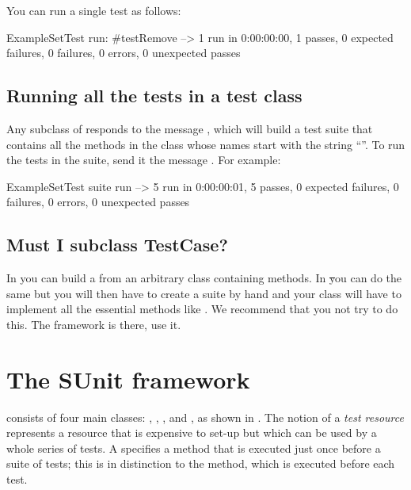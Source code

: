 \documentclass[a4paper,10pt,twoside]{book}
\begin{document}
You can run a single test as follows:

\begin{code}{}
ExampleSetTest run: #testRemove --> 1 run in 0:00:00:00, 1 passes, 0 expected failures, 0 failures, 0 errors, 0 unexpected passes
\end{code}

\subsection{Running all the tests in a test class}

Any subclass of  responds to the message , which will build a test suite that contains all the methods in the class whose names start with the string ``''.
To run the tests in the suite, send it the message .
For example:

\begin{code}{}
ExampleSetTest suite run --> 5 run in 0:00:00:01, 5 passes, 0 expected failures, 0 failures, 0 errors, 0 unexpected passes
\end{code}

\subsection{Must I subclass TestCase?}

In \JUnit{} you can build a  from an arbitrary class containing  methods.
In \st you can do the same but you will then have to create a suite by hand and your class will have to implement all the essential  methods like .
We recommend that you not try to do this.
The framework is there, use it.
\section{The SUnit framework}

\sunit consists of four main classes: , , , and , as shown in .
The notion of a \emph{test resource} represents a resource that is expensive to set-up but which can be used by a whole series of tests.  A  specifies a  method that is executed just once before a suite of tests; this is in distinction to the  method, which is executed before each test.
\end{document}
